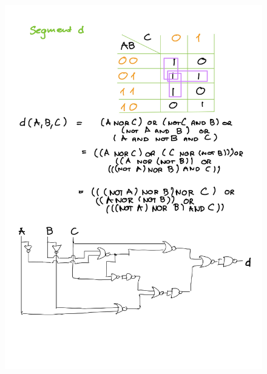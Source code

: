 \documentclass[14pt, table]{extarticle}
\begin{document}
\begin{figure}[H]
\includegraphics[scale=0.2]{Elektronika-24}
\centering
\captionsetup{labelformat=empty}
\caption{}
\end{figure}
\end{document}
